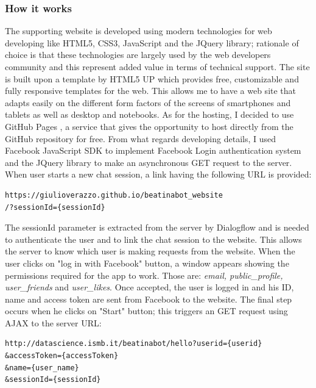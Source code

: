 \documentclass[b5paper,10pt,twoside,cucitura]{toptesi}
\begin{document}
\subsubsection{How it works}
The supporting website is developed using modern technologies for web developing like HTML5, CSS3, JavaScript and the JQuery library; rationale of choice is that these technologies are largely used by the web developers community and this represent added value in terms of technical support. The site is built upon a template by HTML5 UP  \citep{html5up} which provides free, customizable and fully responsive templates for the web. This allows me to have a web site that adapts easily on the different form factors of the screens of smartphones and tablets as well as desktop and notebooks. As for the hosting, I decided to use GitHub Pages   \citep{githubpages}, a service that gives the opportunity to host directly from the GitHub repository for free. From what regards developing details, I used Facebook JavaScript SDK to implement Facebook Login authentication system and the JQuery library to make an asynchronous GET request to the server. When user starts a new chat session, a link having the following URL is provided:

\begin{verbatim}
https://giulioverazzo.github.io/beatinabot_website
/?sessionId={sessionId}
\end{verbatim}

\noindent
The sessionId parameter is extracted from the server by Dialogflow and is needed to authenticate the user and to link the chat session to the website. This allows the server to know which user is making requests from the website. When the user clicks on "log in with Facebook" button, a window appears showing the permissions required for the app to work. Those are: \textit{email, public\_profile, user\_friends} and \textit{user\_likes}. Once accepted, the user is logged in and his ID, name and access token are sent from Facebook to the website. The final step occurs when he clicks on "Start" button; this triggers an GET request using AJAX to the server URL:

\begin{verbatim}
http://datascience.ismb.it/beatinabot/hello?userid={userid}
&accessToken={accessToken}
&name={user_name}
&sessionId={sessionId}
\end{verbatim}
\end{document}
